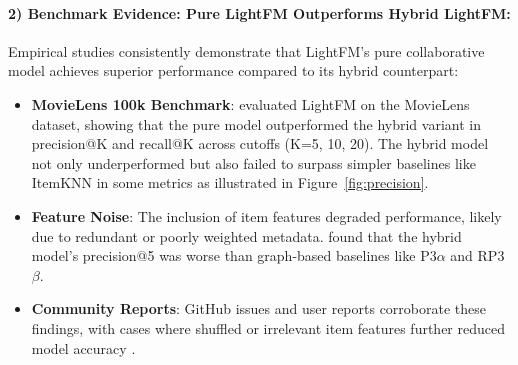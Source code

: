 \paragraph{2) Benchmark Evidence: Pure LightFM Outperforms Hybrid LightFM:}
Empirical studies consistently demonstrate that LightFM's pure collaborative model achieves superior performance compared to its hybrid counterpart:
\begin{itemize}
    \item \textbf{MovieLens 100k Benchmark}: \cite{shu2023lightfm} evaluated LightFM on the MovieLens dataset, showing that the pure model outperformed the hybrid variant in precision@K and recall@K across cutoffs (K=5, 10, 20). The hybrid model not only underperformed but also failed to surpass simpler baselines like ItemKNN in some metrics as illustrated in Figure~\ref{fig:precision}.

    \item \textbf{Feature Noise}: The inclusion of item features degraded performance, likely due to redundant or poorly weighted metadata. \cite{shu2023lightfm} found that the hybrid model's precision@5 was worse than graph-based baselines like P3$\alpha$ and RP3$\beta$.
    \item \textbf{Community Reports}: GitHub issues and user reports corroborate these findings, with cases where shuffled or irrelevant item features further reduced model accuracy \cite{lightfm_issues}.
\end{itemize}
